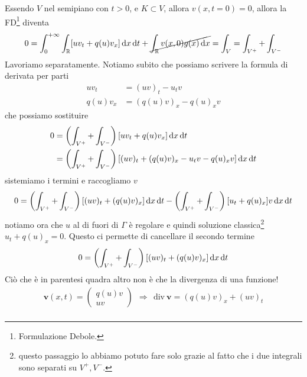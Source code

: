 \begin{dimostrazione}
\begin{figure}[H]
\begin{tikzpicture}[x=0.75pt,y=0.75pt,yscale=-1,xscale=1]
        \end{tikzpicture}
    \end{figure}
    \FloatBarrier

    Essendo $V$ nel semipiano con $t >0$, e $K\subset V$, allora $v(x,t=0) =0$, allora la FD\footnote{Formulazione Debole.} diventa
    \begin{equation*}
        0=\int ^{+\infty }_{0}\int _{\mathbb{R}}[ uv_{t} +q(u) v_{x}] \dx\dt+\cancel{\int _{\mathbb{R}} v(x,0) g(x) \dx} =\int _{V} =\int _{V^{+}} +\int _{V^{-}}
    \end{equation*}
    Lavoriamo separatamente. Notiamo subito che possiamo scrivere la formula di derivata per parti
    \begin{align*}
        uv_{t}     & =(uv)_{t} -u_{t} v        \\
        q(u) v_{x} & =(q(u) v)_{x} -q(u)_{x} v
    \end{align*}
    che possiamo sostituire
    \begin{align*}
        0 & =\left(\int _{V^{+}} +\int _{V^{-}}\right)[ uv_{t} +q(u) v_{x}] \dx\dt                        \\
          & =\left(\int _{V^{+}} +\int _{V^{-}}\right)[(uv)_{t} +(q(u) v)_{x} -u_{t} v-q(u)_{x} v] \dx\dt
    \end{align*}
    sistemiamo i termini e raccogliamo $v$
    \begin{equation*}
        0=\left(\int _{V^{+}} +\int _{V^{-}}\right)[(uv)_{t} +(q(u) v)_{x}] \dx\dt-\left(\int _{V^{+}} +\int _{V^{-}}\right)[ u_{t} +q(u)_{x}] v\dx\dt
    \end{equation*}
    notiamo ora che $u$ al di fuori di $\Gamma $ è regolare e quindi soluzione classica\footnote{questo passaggio lo abbiamo potuto fare solo grazie al fatto che i due integrali sono separati su $V^{+} ,V^{-}$.} $u_{t} +q(u)_{x} =0$. Questo ci permette di cancellare il secondo termine
    \begin{equation*}
        0=\left(\int _{V^{+}} +\int _{V^{-}}\right)[(uv)_{t} +(q(u) v)_{x}] \dx\dt
    \end{equation*}
    Ciò che è in parentesi quadra altro non è che la divergenza di una funzione!
    \begin{gather*}
        \mathbf{v}(x,t) =
        \begin{pmatrix}
            q(u) v \\
            uv
        \end{pmatrix} \ \ \Rightarrow \ \ \mathrm{div} \ \mathbf{v} =(q(u) v)_{x} +(uv)_{t}\\

\end{gather*}
\end{dimostrazione}
